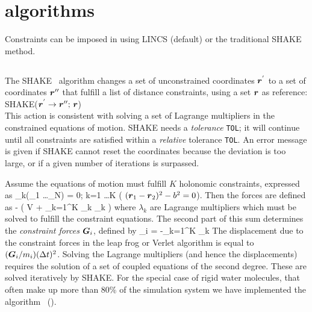 \section{ algorithms}
Constraints can be imposed in {\gromacs} using LINCS (default) or
the traditional SHAKE method.

\subsection{}
The SHAKE~\cite{Ryckaert77} algorithm changes a set of unconstrained
coordinates $\mbox{\boldmath ${r}$}^{'}$ to a set of coordinates $\mbox{\boldmath ${r}$}''$ that
fulfill a  list of distance constraints, using a set $\mbox{\boldmath ${r}$}$ as
reference: \\[1ex] 
\hspace*{5em} SHAKE($\mbox{\boldmath ${r}$}^{'} \rightarrow  \mbox{\boldmath ${r}$}'';\,  \mbox{\boldmath ${r}$}$) \\[1ex]
This action is consistent with solving a set of Lagrange multipliers
in the constrained equations of motion. SHAKE needs a {\em tolerance}
\verb'TOL'; it will continue until all constraints are satisfied
within a {\em relative} tolerance \verb'TOL'. An error message is
given if SHAKE cannot reset the coordinates because the deviation is
too large, or if a given number of iterations is surpassed. 

Assume the equations of motion must fulfill $K$ holonomic constraints,
expressed as
\beq
\sigma_k(_1 \ldots {}_N) = 0; \;\; k=1 \ldots K
\eeq
({\eg} $(\mbox{\boldmath ${r}$}_1 - \mbox{\boldmath ${r}$}_2)^2 - b^2 = 0$). 
Then the forces are defined as 
\beq
-  \left( V + \sum_{k=1}^K \lambda_k
\sigma_k \right)
\eeq
where $\lambda_k$ are Lagrange multipliers which must be solved to
fulfill the constraint equations. The second part of this sum
determines the {\em constraint forces} $\mbox{\boldmath ${G}$}_i$, defined by
\beq
{}_i = -\sum_{k=1}^K \lambda_k 
\eeq
The displacement due to the constraint forces in the leap frog or
Verlet algorithm is equal to $(\mbox{\boldmath ${G}$}_i/m_i)({\Delta t})^2$. Solving the
Lagrange multipliers (and hence the displacements) requires the
solution of a set of coupled equations of the second degree. These are
solved iteratively by SHAKE.
For the special case of rigid water molecules, that often make up more
than 80\% of the simulation system we have implemented the 
algorithm~\cite{Miyamoto92} ().


